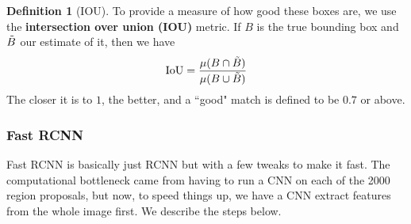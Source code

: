 \documentclass{article}
\theoremstyle{definition}
\theoremstyle{remark}
\theoremstyle{definition}
\newtheorem{definition}{Definition}[section]
\begin{document}
      \begin{definition}[IOU]
      To provide a measure of how good these boxes are, we use the \textbf{intersection over union (IOU)} metric. If $B$ is the true bounding box and $\Tilde{B}$ our estimate of it, then we have 
      \[\mathrm{IoU} = \frac{\mu(B \cap \Tilde{B})}{\mu(B \cup \Tilde{B})}\]
      The closer it is to $1$, the better, and a ``good" match is defined to be $0.7$ or above.  
      \end{definition} 

    \subsubsection{Fast RCNN}

      Fast RCNN is basically just RCNN but with a few tweaks to make it fast. The computational bottleneck came from having to run a CNN on each of the 2000 region proposals, but now, to speed things up, we have a CNN extract features from the whole image first. We describe the steps below. 
\end{document}
